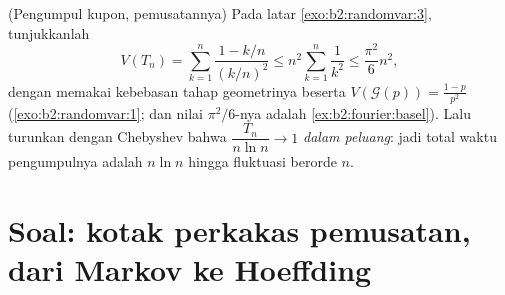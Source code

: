 \begin{exercise}[$\star\star\star$]\label{exo:b2:randomvar:12}
(Pengumpul kupon, pemusatannya) Pada latar
\cref{exo:b2:randomvar:3}, tunjukkanlah
\[
V(T_n) = \sum_{k=1}^n\frac{1 - k/n}{(k/n)^2}
\leq n^2\sum_{k=1}^n\frac{1}{k^2} \leq \frac{\pi^2}{6}n^2,
\]
dengan memakai kebebasan tahap geometrinya beserta $V(\mathcal
G(p)) = \frac{1-p}{p^2}$ (\cref{exo:b2:randomvar:1}; dan nilai
$\pi^2/6$-nya adalah \cref{ex:b2:fourier:basel}). Lalu turunkan dengan
Chebyshev bahwa $\dfrac{T_n}{n\ln n} \to 1$ \emph{dalam
peluang}: jadi total waktu pengumpulnya adalah $n\ln n$ hingga
fluktuasi berorde $n$.
\end{exercise}

\section{Soal: kotak perkakas pemusatan, dari Markov ke
Hoeffding}

